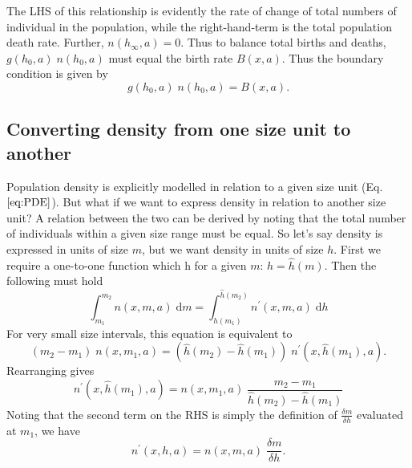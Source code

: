 \documentclass[10pt,twoside]{article}
\begin{document}
The LHS of this relationship is evidently the rate of change of total
numbers of individual in the population, while the right-hand-term is
the total population death rate. Further, \(n(h_{\infty } ,a)=0\). Thus
to balance total births and deaths, \(g(h_{0} ,a) \; n(h_{0} ,a)\) must
equal the birth rate \(B(x, a)\). Thus the boundary condition is given
by
\begin{equation}g(h_{0} ,a) \; n(h_{0} ,a)=B(x, a).
\end{equation}

\subsection{Converting density from one size unit to
another}\label{converting-density-from-one-size-unit-to-another}

Population density is explicitly modelled in relation to a given size
unit (Eq. \(\ref{eq:PDE}\)). But what if we want to express density in
relation to another size unit? A relation between the two can be derived
by noting that the total number of individuals within a given size range
must be equal. So let's say density is expressed in units of size \(m\),
but we want density in units of size \(h\). First we require a
one-to-one function which h for a given \(m\): \(h = \hat{h}(m)\). Then
the following must hold
\begin{equation} \label{eq:n_conversion} \int_{m_1}^{m_2} n(x,m,a) \; \textrm{d}m =  \int_{\hat{h}(m_1)}^{\hat{h}(m_2)} n^\prime(x,m,a) \; \textrm{d}h
\end{equation}
For very small size intervals, this equation is equivalent to
\begin{equation} \left(m_2- m_1 \right) \; n(x,m_1,a) = \left( \hat{h}(m_2) - \hat{h}(m_1)\right) \; n^\prime(x, \hat{h}(m_1),a).
\end{equation}
Rearranging gives
\begin{equation}  n^\prime(x, \hat{h}(m_1),a) = n(x, m_1,a) \; \frac{m_2- m_1}{\hat{h}(m_2) - \hat{h}(m_1)}
\end{equation}
Noting that the second term on the RHS is simply the definition of
\(\frac{\delta m}{\delta h}\) evaluated at \(m_1\), we have
\begin{equation} \label{eq:n_conversion2} n^\prime(x, h, a) = n(x, m,a) \; \frac{\delta m}{\delta h}.
\end{equation}

\clearpage

\end{document}
